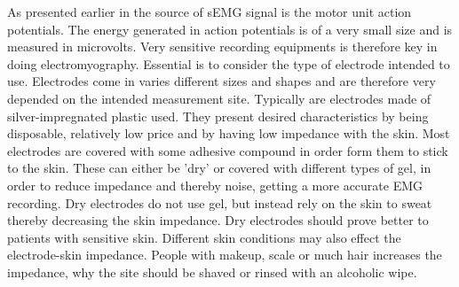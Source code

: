



As presented earlier in  the source of sEMG signal is the motor unit action potentials. The energy generated in action potentials is of a very small size and is measured in microvolts. Very sensitive recording equipments is therefore key in doing electromyography. Essential is to consider the type of electrode intended to use. Electrodes come in varies different sizes and shapes and are therefore very depended on the intended measurement site. Typically are electrodes made of silver-impregnated plastic used. They present desired characteristics by being disposable, relatively low price and by having low impedance with the skin. Most electrodes are covered with some adhesive compound in order form them to stick to the skin. These can either be 'dry' or covered with different types of gel, in order to reduce impedance and thereby noise, getting a more accurate EMG recording. Dry electrodes do not use gel, but instead rely on the skin to sweat thereby decreasing the skin impedance. Dry electrodes should prove better to patients with sensitive skin.\cite{Cram2012} Different skin conditions may also effect the electrode-skin impedance. People with makeup, scale or much hair increases the impedance, why the site should be shaved or rinsed with an alcoholic wipe.   




 


